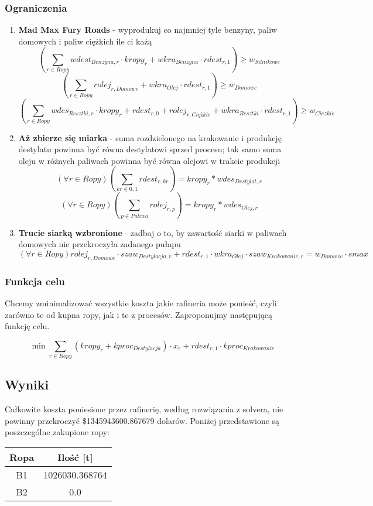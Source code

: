 \documentclass{article}
\theoremstyle{definition}
\theoremstyle{remark}
\theoremstyle{plain}
\theoremstyle{remark}
\theoremstyle{plain}
\begin{document}
\subsubsection{Ograniczenia}
\begin{enumerate}
    \item \textbf{Mad Max Fury Roads} - wyprodukuj co najmniej tyle benzyny, paliw domowych i paliw ciężkich ile ci każą
    \[ \left(\sum_{r \in Ropy}{wdest_{Benzyna, r}\cdot kropy_r + wkra_{Benzyna}\cdot rdest_{r,1}} \right) \geq w_{Silnikowe} \]
    \[ \left(\sum_{r \in Ropy}{rolej_{r, Domowe} + wkra_{Olej}\cdot rdest_{r,1}} \right) \geq w_{Domowe} \]
    \[ \left(\sum_{r \in Ropy}{wdes_{Resztki, r}\cdot kropy_r + rdest_{r,0} + rolej_{r, Ciężkie} + wkra_{Resztki}\cdot rdest_{r,1}} \right) \geq w_{Ciezkie} \]
    \item \textbf{Aż zbierze się miarka} - suma rozdzielonego na krakowanie i produkcję destylatu powinna być równa destylatowi sprzed procesu; tak samo suma oleju w różnych paliwach powinna być równa olejowi w trakcie produkcji
    \[ (\forall r \in Ropy) \left(\sum_{kr \in {0,1}}{rdest_{r, kr}} \right) = kropy_{r} * wdes_{Destylat, r} \]
    \[ (\forall r \in Ropy) \left(\sum_{p \in Paliwa}{rolej_{r, p}} \right) = kropy_{r} * wdes_{Olej, r} \]
    \item \textbf{Trucie siarką wzbronione} - zadbaj o to, by zawartość siarki w paliwach domowych nie przekroczyła zadanego pułapu
    \[ (\forall r \in Ropy) rolej_{r, Domowe}\cdot szaw_{Destylacja, r} + rdest_{r, 1}\cdot wkra_{Olej}\cdot szaw_{Krakowanie, r} = w_{Domowe}\cdot smax \]
\end{enumerate}

\subsubsection{Funkcja celu}
Chcemy zminimalizować wszystkie koszta jakie rafineria może ponieść, czyli zarówno te od kupna ropy,
jak i te z procesów. Zaproponujmy następującą funkcję celu.

\[ \min \sum_{r \in Ropy}{(kropy_r + kproc_{Destylacja})\cdot x_r + rdest_{r,1}\cdot kproc_{Krakowanie}} \]


\subsection{Wyniki}
Całkowite koszta poniesione przez rafinerię, według rozwiązania z solvera, nie powinny przekroczyć \$1345943600.867679 dolarów.
Poniżej przedstawione są poszczególne zakupione ropy:
\begin{table}[H]
    \centering
        \begin{tabular}{|c|c|}
            \hline
            Ropa & Ilość [t]           \\ \hline
            B1   & 1026030.368764 \\ \hline
            B2   & 0.0          \\ \hline
        \end{tabular}
\end{table}
\end{document}
